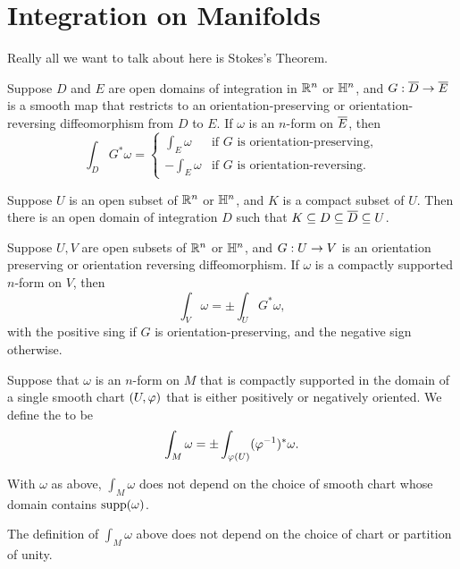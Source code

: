 \newpage\setcounter{section}{15}
\section{Integration on Manifolds}

Really all we want to talk about here is Stokes's Theorem.

\begin{prop}
Suppose $D$ and $E$ are open domains of integration in $\mathbb{R}^n$ or $\mathbb{H}^n$, and $G:\overline D \rightarrow \overline E$ is a smooth map that restricts to an orientation-preserving or orientation-reversing diffeomorphism from $D$ to $E$. If $\omega$ is an $n$-form on $\overline E$, then 
\[\int_D G^*\omega = \begin{cases} \int_E \omega & \text{if $G$ is orientation-preserving},\\
-\int_E \omega & \text{if $G$ is orientation-reversing}.\end{cases}\]
\end{prop}

\begin{lem}
Suppose $U$ is an open subset of $\mathbb{R}^n$ or $\mathbb{H}^n$, and $K$ is a compact subset of $U$. Then there is an open domain of integration $D$ such that $K\subseteq D\subseteq \overline D\subseteq U$.
\end{lem}

\begin{prop}
Suppose $U, V$ are open subsets of $\mathbb{R}^n$ or $\mathbb{H}^n$, and $G:U\rightarrow V$ is an orientation preserving or orientation reversing diffeomorphism. If $\omega$ is a compactly supported $n$-form on $V$, then
\[\int_V\omega = \pm\int_U G^*\omega,\]
with the positive sing if $G$ is orientation-preserving, and the negative sign otherwise.
\end{prop}

\dfn Suppose that $\omega$ is an $n$-form on $M$ that is compactly supported in the domain of a single smooth chart $(U,\varphi)$ that is either positively or negatively oriented. We define the  to be
\[\int_M\omega = \pm\int_{\varphi(U)}(\varphi^{-1})^*\omega.\]

\begin{prop}
With $\omega$ as above, $\int_M\omega$ does not depend on the choice of smooth chart whose domain contains $\text{supp}(\omega)$.
\end{prop}

\begin{prop}
The definition of $\int_M\omega$ above does not depend on the choice of chart or partition of unity.
\end{prop}

